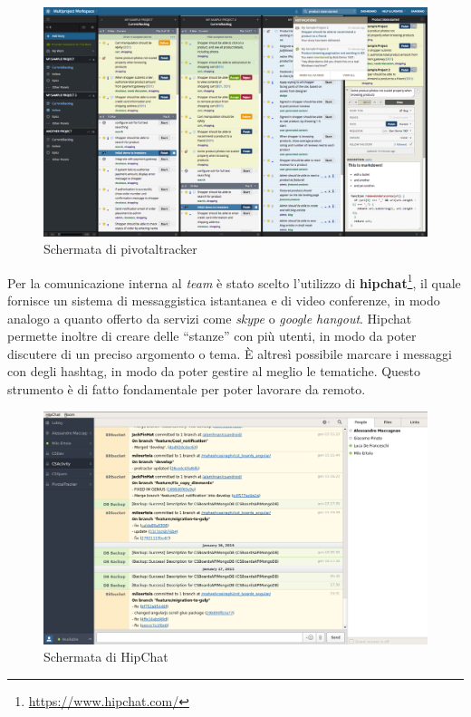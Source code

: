 \begin{figure}[htpd]
\centering
\includegraphics[width=\textwidth]{../immagini/pivotal-tracker}
\caption{Schermata di pivotaltracker}  
\end{figure}

Per la comunicazione interna al \textit{team} è stato scelto l'utilizzo di \textbf{hipchat}\footnote{\url{https://www.hipchat.com/}}, il quale fornisce un sistema di messaggistica istantanea e di video conferenze, in modo analogo a quanto offerto da servizi come \textit{skype} o \textit{google hangout}. Hipchat permette inoltre di creare delle ``stanze'' con più utenti, in modo da poter discutere di un preciso argomento o tema. È altresì possibile marcare i messaggi con degli \gls{hashtag}, in modo da poter gestire al meglio le tematiche. Questo strumento è di fatto fondamentale per poter lavorare da remoto.

\begin{figure}[htpd]
\centering
\includegraphics[width=\textwidth]{../immagini/hipchat}
\caption{Schermata di HipChat}  
\end{figure}

